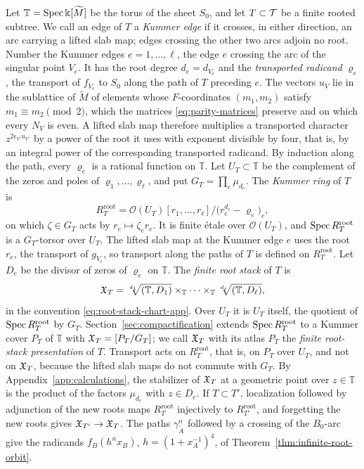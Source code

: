 Let $\mathbb T=\operatorname{Spec}\Bbbk[\widetilde M]$ be the torus of the sheet $S_0$, and let
$T\subset\mathcal T$ be a finite rooted subtree.  We call an edge of $T$ a
\emph{Kummer edge} if it crosses, in either direction, an arc carrying a
lifted slab map; edges crossing the other two arcs adjoin no root.
Number the Kummer edges $e=1,\dots,\ell$, the edge $e$ crossing the arc of the
singular point $V_e$.  It has the root degree $d_e=d_{V_e}$ and the
\emph{transported radicand} $\varrho_e$, the transport of $f_{V_e}$ to $S_0$
along the path of $T$ preceding $e$.  The vectors $u_V$ lie in the
sublattice of $\widetilde M$ of elements whose $F$-coordinates $(m_1,m_2)$
satisfy $m_1\equiv m_2\pmod2$, which the matrices
\eqref{eq:parity-matrices} preserve and on which every $N_V$ is even.  A
lifted slab map therefore multiplies a transported character
$z^{2\epsilon_{V'}u_{V'}}$ by a power of the root it uses with exponent
divisible by four, that is, by an integral power of the corresponding
transported radicand.  By induction along the path, every $\varrho_e$ is a
rational function on $\mathbb T$.  Let $U_T\subset\mathbb T$ be the complement of the zeros
and poles of $\varrho_1,\dots,\varrho_\ell$, and put
$G_T=\prod_e\mu_{d_e}$.  The \emph{Kummer ring} of $T$ is
\begin{equation}\label{eq:finite-kummer-ring}
 R_T^{\mathrm{root}}
 =\mathcal O(U_T)[r_1,\dots,r_\ell]\big/\bigl(r_e^{d_e}-\varrho_e\bigr)_{e},
\end{equation}
on which $\zeta\in G_T$ acts by $r_e\mapsto\zeta_er_e$.  It is finite étale
over $\mathcal O(U_T)$, and $\operatorname{Spec} R_T^{\mathrm{root}}$ is a $G_T$-torsor
over $U_T$.  The lifted slab map at the Kummer edge $e$ uses the root $r_e$,
the transport of $g_{V_e}$, so transport along the paths of $T$ is defined
on $R_T^{\mathrm{root}}$.  Let $D_e$ be the divisor of zeros of
$\varrho_e$ on $\mathbb T$.  The \emph{finite root stack} of $T$ is
\[
 \mathfrak X_T=\sqrt[d_1]{(\mathbb T,D_1)}\times_{\mathbb T}\cdots\times_{\mathbb T}\sqrt[d_\ell]{(\mathbb T,D_\ell)},
\]
in the convention \eqref{eq:root-stack-chart-app}.  Over $U_T$ it is $U_T$
itself, the quotient of $\operatorname{Spec} R_T^{\mathrm{root}}$ by $G_T$.
Section~\ref{sec:compactification} extends $\operatorname{Spec} R_T^{\mathrm{root}}$ to a
Kummer cover $P_T$ of $\mathbb T$ with $\mathfrak X_T=[P_T/G_T]$; we call $\mathfrak X_T$ with
its atlas $P_T$ the \emph{finite root-stack presentation} of $T$.
Transport acts on $R_T^{\mathrm{root}}$, that is, on $P_T$ over $U_T$, and
not on $\mathfrak X_T$, because the lifted slab maps do not commute with $G_T$.
By Appendix~\ref{app:calculations}, the stabilizer of $\mathfrak X_T$ at a
geometric point over $z\in\mathbb T$ is the product of the factors
$\mu_{d_e}$ with $z\in D_e$.  If $T\subset T'$, localization
followed by adjunction of the new roots maps $R_T^{\mathrm{root}}$
injectively to $R_{T'}^{\mathrm{root}}$, and forgetting the new roots gives
$\mathfrak X_{T'}\to\mathfrak X_T$.  The paths $\gamma_{\widetilde A}^n$ followed by a
crossing of the $B_0$-arc give the radicands $f_B(h^nx_B)$,
$h=(1+x_A^{-1})^4$, of Theorem~\ref{thm:infinite-root-orbit}.


